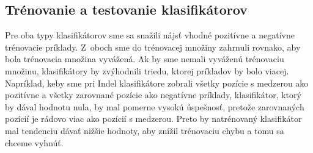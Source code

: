 

\subsection{Trénovanie a testovanie klasifikátorov}

Pre oba typy klasifikátorov sme sa snažili nájsť vhodné pozitívne a negatívne trénovacie príklady. Z~oboch sme do trénovacej množiny zahrnuli rovnako, aby bola trénovacia množina vyvážená. Ak by sme nemali vyváženú trénovaciu množinu, klasifikátory by zvýhodnili triedu, ktorej príkladov by bolo viacej. Napríklad, keby sme pri Indel klasifikátore zobrali všetky pozície s medzerou ako pozitívne a všetky zarovnané pozície ako negatívne príklady, klasifikátor, ktorý by dával hodnotu nula, by mal pomerne vysokú úspešnosť, pretože zarovnaných pozícií je rádovo viac ako pozícií s medzerou. Preto by natrénovaný klasifikátor mal tendenciu dávať nižšie hodnoty, aby znížil trénovaciu chybu a tomu sa chceme vyhnúť.

